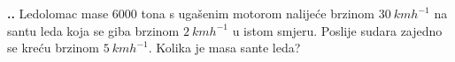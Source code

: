 
\noindent 
\textbf{
\thecjelina.\thezadatak.}
Ledolomac mase $6000$ tona s ugašenim motorom nalijeće brzinom $30\ kmh^{-1}$ na santu leda koja se giba brzinom $2\ kmh^{-1}$ 
u istom smjeru. Poslije sudara zajedno se kreću brzinom $5\ kmh^{-1}$. Kolika je masa sante leda?

